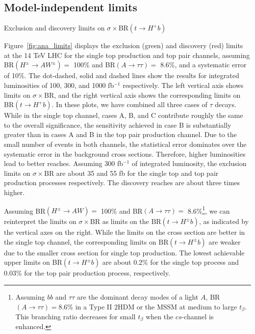 \subsection{Model-independent limits}\label{subsec:ana_limits}

\begin{marginfigure}[-3in]
  \caption{Exclusion and discovery limits on $\sigma\times$BR$(t\rightarrow H^+b)$}
  \label{fig:ana_limits}
\end{marginfigure}

Figure~\ref{fig:ana_limits} displays the exclusion (green) and discovery (red) limits at the 14 TeV LHC for the single top production and top pair channels, assuming BR$(H^\pm\rightarrow AW^\pm) =$ 100\% and BR$(A\rightarrow\tau\tau) =$ 8.6\%, and a systematic error of 10\%. The dot-dashed, solid and dashed lines show the results for integrated luminosities of 100, 300, and 1000 fb$^{-1}$ respectively. The left vertical axis shows limits on $\sigma\times$BR, and the right vertical axis shows the corresponding limits on BR$(t\rightarrow H^+ b)$. In these plots, we have combined all three cases of $\tau$ decays. While in the single top channel, cases A, B, and C contribute roughly the same to the overall significance, the sensitivity achieved in case B is substantially greater than in cases A and B in the top pair production channel. Due to the small number of events in both channels, the statistical error dominates over the systematic error in the background cross sections. Therefore, higher luminosities lead to better reaches. Assuming 300 fb$^{-1}$ of integrated luminosity, the exclusion limits on $\sigma\times\text{BR}$ are about 35 and 55 fb for the single top and top pair production processes respectively. The discovery reaches are about three times higher. 

Assuming BR$(H^{\pm} \rightarrow A W )=$ 100\% and BR$(A \rightarrow \tau\tau)=$ 8.6\%\footnote{Assuming $bb$ and $\tau\tau$ are the dominant decay modes of a light $A$, BR$(A \rightarrow \tau\tau)=8.6$\% in a Type II $2$HDM or the MSSM at medium to large $t_{\beta}$. This branching ratio decreases for small $t_{\beta}$ when the $cs$-channel is enhanced.}, we can reinterpret the limits on $\sigma\times\text{BR}$ as limits on the $\text{BR}(t \rightarrow H^{\pm} b)$, as indicated by the vertical axes on the right. While the limits on the cross section are better in the single top channel, the corresponding limits on $\text{BR}(t \rightarrow H^{\pm} b)$ are weaker due to the smaller cross section for single top production. The lowest achievable upper limits on BR$(t \rightarrow H^{\pm} b)$ are about 0.2\% for the single top process and 0.03\% for the top pair production process, respectively.

